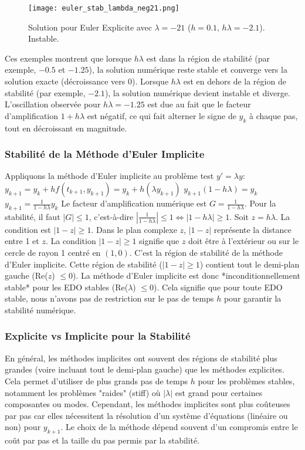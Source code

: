 \documentclass{article}
\begin{document}
\begin{figure}[H]
\centering
\texttt{[image: euler\_stab\_lambda\_neg21.png]}
\caption{Solution pour Euler Explicite avec $\lambda=-21$ ($h=0.1$, $h\lambda=-2.1$). Instable.}
\label{fig:euler_stab_neg21}
\end{figure}

Ces exemples montrent que lorsque $h\lambda$ est dans la région de stabilité (par exemple, $-0.5$ et $-1.25$), la solution numérique reste stable et converge vers la solution exacte (décroissance vers 0). Lorsque $h\lambda$ est en dehors de la région de stabilité (par exemple, $-2.1$), la solution numérique devient instable et diverge. L'oscillation observée pour $h\lambda = -1.25$ est due au fait que le facteur d'amplification $1+h\lambda$ est négatif, ce qui fait alterner le signe de $y_k$ à chaque pas, tout en décroissant en magnitude.

\subsubsection*{Stabilité de la Méthode d'Euler Implicite}

Appliquons la méthode d'Euler implicite au problème test $y' = \lambda y$:
$y_{k+1} = y_k + h f(t_{k+1}, y_{k+1}) = y_k + h (\lambda y_{k+1})$
$y_{k+1} (1 - h\lambda) = y_k$
$y_{k+1} = \frac{1}{1 - h\lambda} y_k$
Le facteur d'amplification numérique est $G = \frac{1}{1 - h\lambda}$. Pour la stabilité, il faut $|G| \le 1$, c'est-à-dire $|\frac{1}{1 - h\lambda}| \le 1 \iff |1 - h\lambda| \ge 1$.
Soit $z = h\lambda$. La condition est $|1 - z| \ge 1$.
Dans le plan complexe $z$, $|1 - z|$ représente la distance entre 1 et $z$. La condition $|1 - z| \ge 1$ signifie que $z$ doit être à l'extérieur ou sur le cercle de rayon 1 centré en $(1, 0)$. C'est la région de stabilité de la méthode d'Euler implicite.
Cette région de stabilité ($|1 - z| \ge 1$) contient tout le demi-plan gauche (Re($z$) $\le 0$).
La méthode d'Euler implicite est donc *inconditionnellement stable* pour les EDO stables (Re($\lambda$) $\le 0$). Cela signifie que pour toute EDO stable, nous n'avons pas de restriction sur le pas de temps $h$ pour garantir la stabilité numérique.

\subsubsection*{Explicite vs Implicite pour la Stabilité}

En général, les méthodes implicites ont souvent des régions de stabilité plus grandes (voire incluant tout le demi-plan gauche) que les méthodes explicites. Cela permet d'utiliser de plus grands pas de temps $h$ pour les problèmes stables, notamment les problèmes "raides" (stiff) où $|\lambda|$ est grand pour certaines composantes ou modes. Cependant, les méthodes implicites sont plus coûteuses par pas car elles nécessitent la résolution d'un système d'équations (linéaire ou non) pour $y_{k+1}$. Le choix de la méthode dépend souvent d'un compromis entre le coût par pas et la taille du pas permis par la stabilité.
\end{document}

